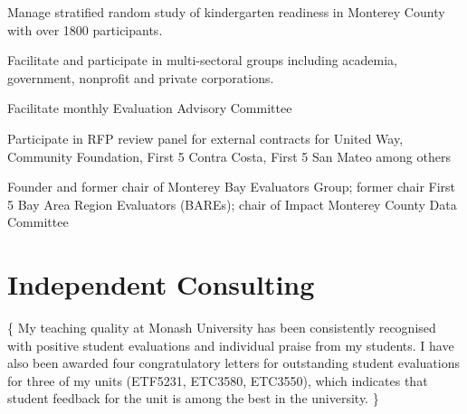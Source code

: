 \documentclass[11pt, a4paper]{awesome-cv}
\begin{document}
\begin{cventries}
{\begin{cvitems}
\item Manage stratified random study of kindergarten readiness in Monterey County with over 1800 participants.
\item Facilitate and participate in multi-sectoral groups including academia, government, nonprofit and private corporations.
\item Facilitate monthly Evaluation Advisory Committee
\item Participate in RFP review panel for external contracts for United Way, Community Foundation, First 5 Contra Costa, First 5 San Mateo among others
\item Founder and former chair of Monterey Bay Evaluators Group; former chair First 5 Bay Area Region Evaluators (BAREs);  chair of Impact Monterey County Data Committee
\end{cvitems}}
\end{cventries}

\hypertarget{independent-consulting}{%
\section{Independent Consulting}\label{independent-consulting}}

\footnotesize\{ My teaching quality at Monash University has been
consistently recognised with positive student evaluations and individual
praise from my students. I have also been awarded four congratulatory
letters for outstanding student evaluations for three of my units
(ETF5231, ETC3580, ETC3550), which indicates that student feedback for
the unit is among the best in the university. \}
\end{document}
